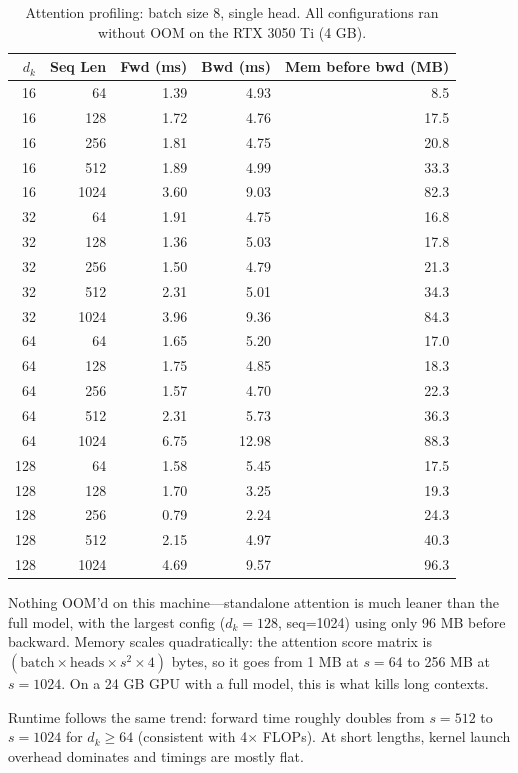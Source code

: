 \documentclass[11pt]{article}
\begin{document}
\begin{table}[h]
\centering
\small
\begin{tabular}{rrrrr}
\toprule
$d_k$ & Seq Len & Fwd (ms) & Bwd (ms) & Mem before bwd (MB) \\
\midrule
16  &   64 & 1.39 & 4.93 &  8.5 \\
16  &  128 & 1.72 & 4.76 & 17.5 \\
16  &  256 & 1.81 & 4.75 & 20.8 \\
16  &  512 & 1.89 & 4.99 & 33.3 \\
16  & 1024 & 3.60 & 9.03 & 82.3 \\
\midrule
32  &   64 & 1.91 & 4.75 & 16.8 \\
32  &  128 & 1.36 & 5.03 & 17.8 \\
32  &  256 & 1.50 & 4.79 & 21.3 \\
32  &  512 & 2.31 & 5.01 & 34.3 \\
32  & 1024 & 3.96 & 9.36 & 84.3 \\
\midrule
64  &   64 & 1.65 & 5.20 & 17.0 \\
64  &  128 & 1.75 & 4.85 & 18.3 \\
64  &  256 & 1.57 & 4.70 & 22.3 \\
64  &  512 & 2.31 & 5.73 & 36.3 \\
64  & 1024 & 6.75 & 12.98 & 88.3 \\
\midrule
128 &   64 & 1.58 & 5.45 & 17.5 \\
128 &  128 & 1.70 & 3.25 & 19.3 \\
128 &  256 & 0.79 & 2.24 & 24.3 \\
128 &  512 & 2.15 & 4.97 & 40.3 \\
128 & 1024 & 4.69 & 9.57 & 96.3 \\
\bottomrule
\end{tabular}
\caption{Attention profiling: batch size 8, single head. All configurations ran without OOM on the RTX 3050 Ti (4 GB).}
\end{table}

Nothing OOM'd on this machine---standalone attention is much leaner than the full model, with the largest config ($d_k=128$, seq=1024) using only 96 MB before backward. Memory scales quadratically: the attention score matrix is $(\text{batch} \times \text{heads} \times s^2 \times 4)$ bytes, so it goes from 1 MB at $s=64$ to 256 MB at $s=1024$. On a 24 GB GPU with a full model, this is what kills long contexts.

Runtime follows the same trend: forward time roughly doubles from $s=512$ to $s=1024$ for $d_k \ge 64$ (consistent with 4$\times$ FLOPs). At short lengths, kernel launch overhead dominates and timings are mostly flat.
\end{document}
